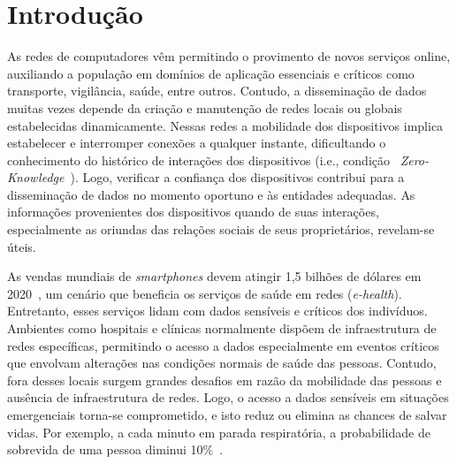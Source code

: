 \documentclass[12pt]{article}
\newcommand{\agn}[1]{\textcolor{auburn}{#1}}
\begin{document}
\section{Introdução}

As redes de computadores vêm permitindo o provimento de novos serviços online, auxiliando a população em domínios de aplicação essenciais e críticos como transporte, vigilância, saúde, entre outros.
Contudo, a disseminação
\agn{de}
dados muitas vezes depende da criação e manutenção de redes locais ou globais estabelecidas dinamicamente.
\agn{Nessas redes}
a mobilidade dos dispositivos implica estabelecer e interromper conexões a qualquer instante, dificultando o conhecimento do histórico de interações
\agn{dos}
dispositivos (i.e., condição ~\textit{Zero-Knowledge}~\cite{kim2015hcs}). %
\agn{Logo,}
verificar a confiança dos dispositivos contribui para a disseminação de dados no momento oportuno e às entidades adequadas.
\agn{As}
informações provenientes dos dispositivos quando de suas interações, especialmente as oriundas das relações sociais de seus proprietários, revelam-se úteis. 

As vendas mundiais de \textit{smartphones} devem atingir 1,5 bilhões de dólares em 2020~\cite{statista2019}, um cenário que beneficia os serviços de saúde em redes (\textit{e-health}).
Entretanto, esses serviços lidam com dados sensíveis e críticos dos indivíduos. 
Ambientes como hospitais e clínicas normalmente dispõem de infraestrutura de redes específicas, permitindo o acesso a dados especialmente em eventos críticos que envolvam
alterações nas condições normais de saúde das pessoas. Contudo, fora desses locais surgem grandes desafios em razão da mobilidade das pessoas e ausência de infraestrutura de redes.
Logo, o acesso a dados sensíveis em situações emergenciais torna-se comprometido, e isto reduz ou elimina as chances de salvar vidas. Por exemplo, a cada minuto em parada respiratória, a probabilidade de sobrevida de uma pessoa diminui 10\%~\cite{pazin2003parada}.
\end{document}
